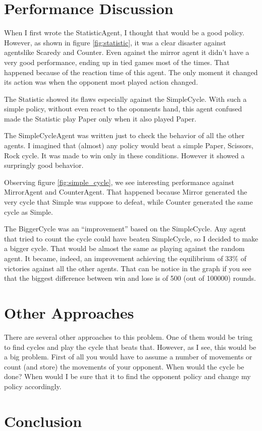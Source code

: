 \documentclass[12pt]{article}
\begin{document}
\section{Performance Discussion}

When I first wrote the StatisticAgent, I thought that would be a good policy.
However, as shown in figure \ref{fig:statistic}, it was a clear disaster against agentslike Scaredy and Counter. Even against the mirror agent it didn't have a very good performance, ending up in tied games most of the times. That happened because of the reaction time of this agent. The only moment it changed its action was when the opponent most played action changed.

The Statistic showed its flaws especially against the SimpleCycle. With such a simple policy, without even react to the oponnents hand, this agent confused made the Statistic play Paper only when it also played Paper.

The SimpleCycleAgent was written just to check the behavior of all the other agents. I imagined that (almost) any policy would beat a simple Paper, Scissors, Rock cycle. It was made to win only in these conditions. However it showed a surpringly good behavior.

Observing figure \ref{fig:simple_cycle}, we see interesting performance against MirrorAgent and CounterAgent. That happened because Mirror generated the very cycle that Simple was suppose to defeat, while Counter generated the same cycle as Simple.

The BiggerCycle was an ``improvement'' based on the SimpleCycle. Any agent that tried to count the cycle could have beaten SimpleCycle, so I decided to make a bigger cycle. That would be almost the same as playing against the random agent. It became, indeed, an improvement achieving the equilibrium of 33\% of victories against all the other agents. That can be notice in the graph if you see that the biggest difference between win and lose is of 500 (out of 100000) rounds.

\section{Other Approaches}

There are several other approaches to this problem. One of them would be tring to find cycles and play the cycle that beats that. However, as I see, this would be a big problem. First of all you would have to assume a number of movements or count (and store) the movements of your opponent. When would the cycle be done? When would I be sure that it 
 to find the opponent policy and change my policy accordingly.

\section{Conclusion}
\end{document}
